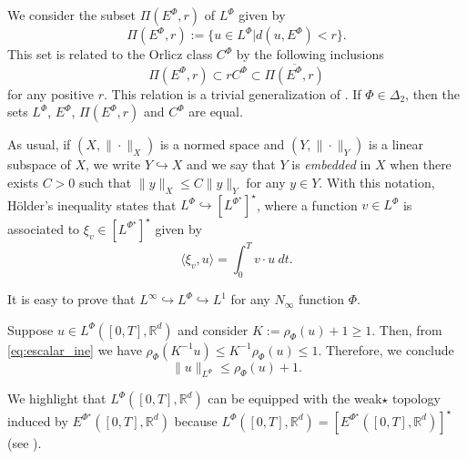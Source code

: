 \documentclass[twoside]{article}
\newtheorem{prop}[thm]{Proposition}
\theoremstyle{remark}
\newcommand{\orlnor}{\|_{L^{\Phi}}}
\newcommand{\lphi}{L^{\Phi}}
\newcommand{\lpsi}{L^{\Phi^{\star}}}
\newcommand{\ephi}{E^{\Phi}}
\newcommand{\claseor}{C^{\Phi}}
\newcommand{\rr}{\mathbb{R}}
\renewcommand{\leq}{\leqslant}
\renewcommand{\geq}{\geqslant}
\newcommand{\epsi}{E^{\Phi^{\star}}}
\begin{document}
We consider the subset $\Pi(\ephi,r)$ of $\lphi$ given by
\[\Pi(\ephi,r):=\{u\in\lphi| d(u,\ephi)<r\}.\]
This set is related to the Orlicz class $\claseor$ by the following inclusions
\begin{equation}\label{eq:inclusiones}\Pi(\ephi, r )\subset r \claseor\subset\overline{\Pi(\ephi,r)}
\end{equation}
for any positive $r$. This relation is a trivial generalization of  \cite[Thm. 5.6]{Orliczvectorial2005}.
If $\Phi \in \Delta_2$,  then the sets $\lphi$, $\ephi$, $\Pi(\ephi,r)$ and $\claseor$ are equal.
 
As usual, if $(X,\|\cdot\|_X)$ is a normed space and $(Y,\|\cdot \|_Y)$ is a linear subspace of $X$,  we write $Y\hookrightarrow X$ and we say that $Y$ is \emph{embedded} in $X$  when there exists $C>0$ such that
$\|y\|_X\leq C\|y\|_Y$ for any $y\in Y$.  With this notation, H\"older's inequality states that  $\lphi\hookrightarrow  \left[\lpsi\right]^\star$, where a function $v\in\lphi$ is associated  to $\xi_v\in \left[\lpsi\right]^\star$ given by
\begin{equation}\label{pairing}
  \langle \xi_v,u\rangle=\int_0^Tv\cdot u\ dt.
\end{equation}

It is easy to prove that $L^{\infty} \hookrightarrow L^\Phi\hookrightarrow L^1$ for any $N_{\infty}$ function $\Phi$.

Suppose $u\in\lphi([0,T],\rr^d)$ and consider $K:=\rho_{\Phi}(u)+1\geq 1$. Then, from \ref{eq:escalar_ine} we have $\rho_{\Phi}(K^{-1}u)\leq K^{-1}\rho_{\Phi}(u)\leq 1$. Therefore, we conclude 
\begin{equation}\label{eq:amemiya}
 \|u\orlnor \leq \rho_{\Phi}(u)+1.
\end{equation}




 


We highlight that $\lphi\left([0,T],\rr^d\right)$ can be equipped with the weak$\star$ topology induced by $\epsi\left([0,T],\rr^d\right)$ because 
$\lphi\left([0,T],\rr^d\right)=\left[\epsi\left([0,T],\rr^d\right)\right]^{\star}$ (see \cite[Thm. 3.3]{gwiazda2013anisotropic}).
\end{document}
